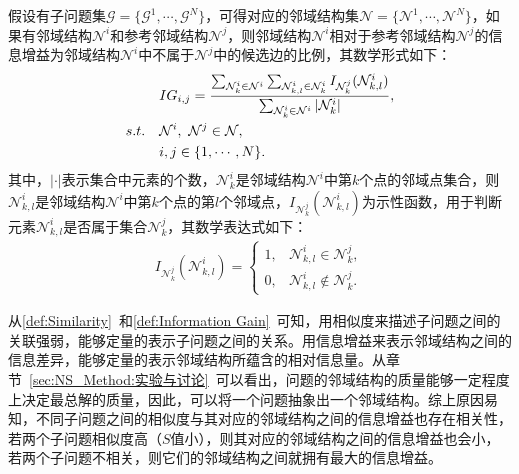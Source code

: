 \begin{definition}
    \label{def:Information Gain}
    假设有子问题集$\mathcal{G} = \{ \mathcal{G}^1, \cdots , \mathcal{G}^N \}$，可得对应的邻域结构集$\mathcal{N} = \{ \mathcal{N}^1, \cdots , \mathcal{N}^N \}$，如果有邻域结构$\mathcal{N}^i$和参考邻域结构$\mathcal{N}^j$，则邻域结构$\mathcal{N}^i$相对于参考邻域结构$\mathcal{N}^j$的信息增益为邻域结构$\mathcal{N}^i$中不属于$\mathcal{N}^j$中的候选边的比例，其数学形式如下：
    \begin{align}
        \label{eq:Information Gain}
        & IG_{i,j} =  \frac{\sum_{\mathcal{N}^i_k \in \mathcal{N}^i} \sum_{\mathcal{N}^i_{k,l} \in \mathcal{N}^i_k} I_{\mathcal{N}_k^j} (\mathcal{N}_{k,l}^i)}{\sum_{\mathcal{N}^i_k \in \mathcal{N}^i} |\mathcal{N}^i_k|}, \\
        s.t. \quad & \mathcal{N}^i, \ \mathcal{N}^j \in \mathcal{N}, \notag  \\
                   & i,j \in \{ 1, \cdots, N \}. \notag
    \end{align}
    其中，$|\cdot|$表示集合中元素的个数，$\mathcal{N}^i_k$是邻域结构$\mathcal{N}^i$中第$k$个点的邻域点集合，则$\mathcal{N}^i_{k,l}$是邻域结构$\mathcal{N}^i$中第$k$个点的第$l$个邻域点，$I_{\mathcal{N}_k^j} (\mathcal{N}_{k,l}^i)$为示性函数，用于判断元素$\mathcal{N}_{k,l}^i$是否属于集合$\mathcal{N}_k^j$，其数学表达式如下：
    \begin{align}
        \label{eq:示性函数}
        I_{\mathcal{N}_k^j} (\mathcal{N}_{k,l}^i) = 
        \begin{cases}
            1, & \mathcal{N}_{k,l}^i \in \mathcal{N}_k^j,     \\
            0, & \mathcal{N}_{k,l}^i \not \in \mathcal{N}_k^j.
        \end{cases}
    \end{align}
\end{definition}
\par
从\autoref{def:Similarity}~和\autoref{def:Information Gain}~可知，用相似度来描述子问题之间的关联强弱，能够定量的表示子问题之间的关系。用信息增益来表示邻域结构之间的信息差异，能够定量的表示邻域结构所蕴含的相对信息量。从章节~\ref{sec:NS_Method:实验与讨论}~可以看出，问题的邻域结构的质量能够一定程度上决定最总解的质量，因此，可以将一个问题抽象出一个邻域结构。综上原因易知，不同子问题之间的相似度与其对应的邻域结构之间的信息增益也存在相关性，若两个子问题相似度高（$S$值小），则其对应的邻域结构之间的信息增益也会小，若两个子问题不相关，则它们的邻域结构之间就拥有最大的信息增益。
\par
